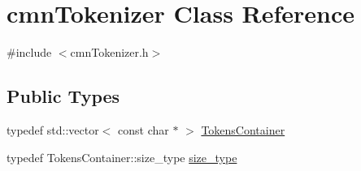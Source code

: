 \hypertarget{classcmn_tokenizer}{}\section{cmn\+Tokenizer Class Reference}
\label{classcmn_tokenizer}


{\ttfamily \#include $<$cmn\+Tokenizer.\+h$>$}

\subsection*{Public Types}
\begin{DoxyCompactItemize}
\item 
typedef std\+::vector$<$ const char $\ast$ $>$ \hyperlink{classcmn_tokenizer_a6f2e13cc6f1f02a1692febd80eb7c0e2}{Tokens\+Container}
\item 
typedef Tokens\+Container\+::size\+\_\+type \hyperlink{classcmn_tokenizer_aa1b3819de936a3639e8ef5841f7fe762}{size\+\_\+type}
\end{DoxyCompactItemize}
